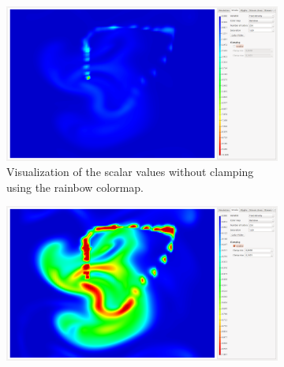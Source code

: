 \begin{figure}[tb]
	\centering
	\begin{subfigure}[t]{0.4\textwidth}
		\centering
		\includegraphics[width=\textwidth, trim={35px 30px 430px 30px}, clip]{colormapping/img/notclamped}
		\caption{Visualization of the scalar values without clamping using the rainbow colormap.}
		\label{fig:colormapping:clamped:disabled}
	\end{subfigure}
	\hspace{50px}
	\begin{subfigure}[t]{0.4\textwidth}
		\centering
		\includegraphics[width=\textwidth, trim={35px 30px 430px 30px}, clip]{colormapping/img/clamped_01}

\end{subfigure}
\end{figure}
